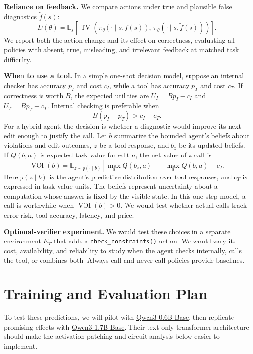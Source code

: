\documentclass[11pt]{article}
\newcommand{\E}{\mathbb{E}}
\newcommand{\TV}{\operatorname{TV}}
\begin{document}
\textbf{Reliance on feedback.} We compare actions under true and plausible false diagnostics $\tilde f(s)$:
\begin{equation}
  D(\theta)=\E_s\!\left[\TV\!\left(\pi_\theta(\cdot\mid s,f(s)),\,\pi_\theta(\cdot\mid s,\tilde f(s))\right)\right]. \label{eq:dependence}
\end{equation}
We report both the action change and its effect on correctness, evaluating all policies with absent, true, misleading, and irrelevant feedback at matched task difficulty.

\textbf{When to use a tool.} In a simple one-shot decision model, suppose an internal checker has accuracy $p_I$ and cost $c_I$, while a tool has accuracy $p_T$ and cost $c_T$. If correctness is worth $B$, the expected utilities are $U_I=Bp_I-c_I$ and $U_T=Bp_T-c_T$. Internal checking is preferable when
\begin{equation}
  B(p_I-p_T)>c_I-c_T. \label{eq:threshold}
\end{equation}
For a hybrid agent, the decision is whether a diagnostic would improve its next edit enough to justify the call. Let $b$ summarize the bounded agent's beliefs about violations and edit outcomes, $z$ be a tool response, and $b_z$ be its updated beliefs. If $Q(b,a)$ is expected task value for edit $a$, the net value of a call is
\begin{equation}
  \operatorname{VOI}(b)=\E_{z\sim p(\cdot\mid b)}\!\left[\max_a Q(b_z,a)\right]-\max_a Q(b,a)-c_T. \label{eq:voi}
\end{equation}
Here $p(z\mid b)$ is the agent's predictive distribution over tool responses, and $c_T$ is expressed in task-value units. The beliefs represent uncertainty about a computation whose answer is fixed by the visible state. In this one-step model, a call is worthwhile when $\operatorname{VOI}(b)>0$. We would test whether actual calls track error risk, tool accuracy, latency, and price.

\textbf{Optional-verifier experiment.} We would test these choices in a separate environment $E_T$ that adds a \texttt{check\_constraints()} action. We would vary its cost, availability, and reliability to study when the agent checks internally, calls the tool, or combines both. Always-call and never-call policies provide baselines.

\section{Training and Evaluation Plan}
To test these predictions, we will pilot with \href{https://huggingface.co/Qwen/Qwen3-0.6B-Base}{Qwen3-0.6B-Base}, then replicate promising effects with \href{https://huggingface.co/Qwen/Qwen3-1.7B-Base}{Qwen3-1.7B-Base}. Their text-only transformer architecture should make the activation patching and circuit analysis below easier to implement.
\end{document}
